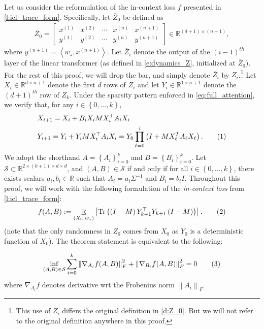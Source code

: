 \documentclass{article}
\DeclareMathOperator{\E}{\mathbb{E}}
\newcommand{\R}{\mathbb{R}}
\renewcommand{\S}{{\mathcal S}}
\newcommand{\wstar}{w_\star}
\newcommand{\tx}[1]{x^{(#1)}}
\newcommand{\ty}[1]{y^{(#1)}}
\DeclareMathOperator{\tr}{Tr}
\newcommand*\lin[1]{\left\langle #1 \right\rangle}
\newcommand*\lrb[1]{\left[ #1 \right]}
\newcommand*\lrn[1]{\left\| #1 \right\|}
\newcommand*\lrp[1]{\left( #1 \right)}
\newcommand*\lrbb[1]{\left\{ #1 \right\}}
\newcommand\numberthis{\addtocounter{equation}{1}\tag{\theequation}}
\begin{document}
Let us consider the reformulation of the in-context loss $f$ presented in \autoref{l:icl_trace_form}. Specifically, let $\overline{Z}_0$ be defined as 
\begin{align*}
\overline{Z}_0 = \begin{bmatrix}
\tx{1} & \tx{2} & \cdots & \tx{n} &\tx{n+1} \\ 
\ty{1} & \ty{2} & \cdots &\ty{n}& \ty{n+1}
\end{bmatrix} \in \R^{(d+1) \times (n+1)},
\end{align*}
where $\ty{n+1} = \lin{\wstar, \tx{n+1}}$. Let $\overline{Z}_i$ denote the output of the $(i-1)^{th}$ layer of the linear transformer (as defined in \eqref{e:dynamics_Z}, initialized at $\overline{Z}_0$). For the rest of this proof, we will drop the bar, and simply denote $\overline{Z}_i$ by $Z_i$.\footnote{This use of $Z_i$ differs the original definition in \eqref{d:Z_0}. But we will not refer to the original definition anywhere in this proof.} Let $X_i\in \R^{d\times n+1}$ denote the first $d$ rows of $Z_i$ and let $Y_i\in \R^{1\times n+1}$ denote the $(d+1)^{th}$ row of $Z_k$. Under the sparsity pattern enforced in \eqref{eq:full_attention}, we verify that, for any $i \in \lrbb{0,\dots,k}$,
\begin{align*}
& X_{i+1} =  X_{i}  + B_i X_i M X_{i}^\top A_i X_{i} \\
& Y_{i+1} =  Y_{i}  + Y_{i} M X_{i}^\top A_i X_{i} = Y_0 \prod_{\ell=0}^{i} \lrp{I + M X_\ell^T A_\ell X_\ell}.
\numberthis \label{e:t:XY_dynamics}
\end{align*}
We adopt the shorthand $A = \lrbb{A_i}_{i=0}^k$ and $B = \lrbb{B_i}_{i=0}^k$. Let $\S \subset \R^{2\times (k+1) \times d \times d}$, and $(A,B) \in \S$ if and only if for all $i\in \lrbb{0,\dots,k}$, there exists scalars $a_i,b_i \in \R$ such that $A_i = a_i \Sigma^{-1}$ and $B_i = b_i I$. Throughout this proof, we will work with the following formulation of the \emph{in-context loss} from \autoref{l:icl_trace_form}:
\begin{align*}
f(A,B) := \E_{(X_0,\wstar)} \lrb{\tr\lrp{\lrp{I-M}Y_{k+1}^\top Y_{k+1}\lrp{I-M}}}.
\numberthis \label{e:t:simpler_f}
\end{align*}
(note that the only randomness in $Z_0$ comes from $X_0$ as $Y_0$ is a deterministic function of $X_0$). The theorem statement is equivalent to the following:

\begin{align*}
\inf_{(A,B) \in \S} \sum_{i=0}^k \lrn{\nabla_{A_i} f(A,B)}_F^2 + \lrn{\nabla_{B_i} f(A,B)}_F^2 = 0
\numberthis \label{e:main_theorem_goal_PQ}
\end{align*}
where $\nabla_{A_i} f$ denotes derivative wrt the Frobenius norm $\lrn{A_i}_F$.
\end{document}
